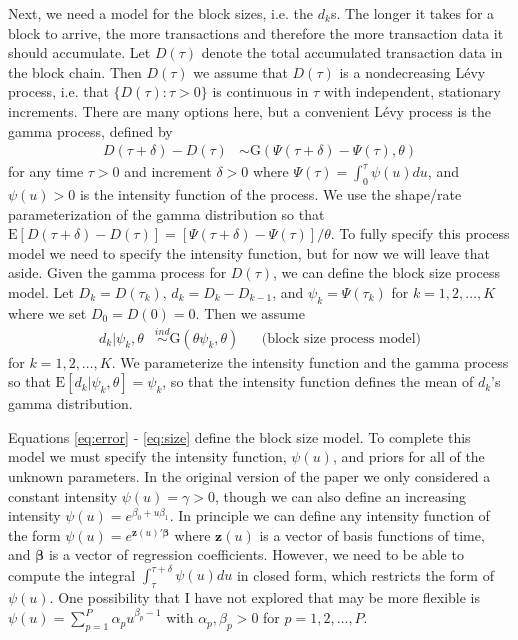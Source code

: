 \documentclass[12pt]{article}
\begin{document}
Next, we need a model for the block sizes, i.e. the $d_k$s. The longer it takes for a block to arrive, the more transactions and therefore the more transaction data it should accumulate. Let $D(\tau)$ denote the total accumulated transaction data in the block chain. Then $D(\tau)$ we assume that $D(\tau)$ is a nondecreasing L\'{e}vy process, i.e. that $\{D(\tau): \tau > 0\}$ is continuous in $\tau$ with independent, stationary increments. There are many options here, but a convenient L\'{e}vy process is the gamma process, defined by
\begin{align*}
D(\tau + \delta) - D(\tau) &\sim \mathrm{G}(\Psi(\tau + \delta) - \Psi(\tau), \theta)
\end{align*}
for any time $\tau>0$ and increment $\delta > 0$ where $\Psi(\tau) = \int_0^\tau\psi(u)du$, and $\psi(u)>0$ is the intensity function of the  process. We use the shape/rate parameterization of the gamma distribution so that $\mathrm{E}[D(\tau + \delta) - D(\tau)] = [\Psi(\tau + \delta) - \Psi(\tau)]/\theta$. To fully specify this process model we need to specify the intensity function, but for now we will leave that aside. Given the gamma process for $D(\tau)$, we can define the block size process model. Let $D_k = D(\tau_k)$, $d_k = D_k - D_{k-1}$, and $\psi_k = \Psi(\tau_k)$ for $k=1,2,\dots,K$ where we set $D_0 = D(0) = 0$. Then we assume
\begin{align}
d_k | \psi_k, \theta &\stackrel{ind}{\sim}\mathrm{G}(\theta\psi_k, \theta) && \mbox{(block size process model)}\label{eq:size}
\end{align}
for $k=1,2,\dots,K$. We parameterize the intensity function and the gamma process so that $\mathrm{E}[d_k|\psi_k,\theta] = \psi_k$, so that the intensity function defines the mean of $d_k$'s gamma distribution.

Equations \eqref{eq:error} - \eqref{eq:size} define the block size model. To complete this model we must specify the intensity function, $\psi(u)$, and priors for all of the unknown parameters. In the original version of the paper we only considered a constant intensity $\psi(u) = \gamma > 0$, though we can also define an increasing intensity $\psi(u) = e^{\beta_0 + u\beta_1}$. In principle we can define any intensity function of the form $\psi(u) = e^{\bm{z}(u)'\bm{\beta}}$ where $\bm{z}(u)$ is a vector of basis functions of time, and $\bm{\beta}$ is a vector of regression coefficients. However, we need to be able to compute the integral $\int_{\tau}^{\tau + \delta}\psi(u)du$ in closed form, which restricts the form of $\psi(u)$. One possibility that I have not explored that may be more flexible is $\psi(u) = \sum_{p=1}^P\alpha_pu^{\beta_p - 1}$ with $\alpha_p, \beta_p>0$ for $p=1,2,\dots,P$.
\end{document}
